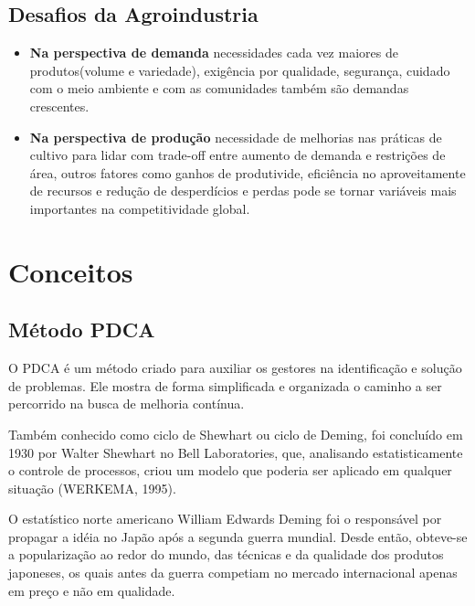\documentclass[
]{article}
\begin{document}
\hypertarget{desafios-da-agroindustria}{%
\subsection*{Desafios da Agroindustria}\label{desafios-da-agroindustria}}

\begin{itemize}
\item
  \textbf{Na perspectiva de demanda} necessidades cada vez maiores de produtos(volume e variedade), exigência por qualidade, segurança, cuidado com o meio ambiente e com as comunidades também são demandas crescentes.
\item
  \textbf{Na perspectiva de produção} necessidade de melhorias nas práticas de cultivo para lidar com trade-off entre aumento de demanda e restrições de área, outros fatores como ganhos de produtivide, eficiência no aproveitamente de recursos e redução de desperdícios e perdas pode se tornar variáveis mais importantes na competitividade global.
\end{itemize}

\hypertarget{conceitos}{%
\section{Conceitos}\label{conceitos}}

\hypertarget{muxe9todo-pdca}{%
\subsection{Método PDCA}\label{muxe9todo-pdca}}

O PDCA é um método criado para auxiliar os gestores na identificação e solução de problemas. Ele mostra de forma simplificada e organizada o caminho a ser percorrido na busca de melhoria contínua.

Também conhecido como ciclo de Shewhart ou ciclo de Deming, foi concluído em 1930 por Walter Shewhart no Bell Laboratories, que, analisando estatisticamente o controle de processos, criou um modelo que poderia ser aplicado em qualquer situação (WERKEMA, 1995).

O estatístico norte americano William Edwards Deming foi o responsável por propagar a idéia no Japão após a segunda guerra mundial. Desde então, obteve-se a popularização ao redor do mundo, das técnicas e da qualidade dos produtos japoneses, os quais antes da guerra competiam no mercado internacional apenas em preço e não em qualidade.
\end{document}
